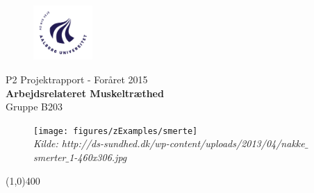 \clearpage
\thispagestyle{empty}

\begin{figure}[H]
	\raggedleft
		\includegraphics[width=0.2\textwidth]{figures/aaulogo-da.png}
\end{figure}
\vspace*{\fill} 
\begin{center}	
\begin{Huge}
P2 Projektrapport - Foråret 2015\\
\vspace{5 mm}
\textbf{Arbejdsrelateret Muskeltræthed}\\
\vspace{3 mm}
Gruppe B203
\end{Huge}
\end{center}
\vspace*{\fill}

\begin{figure}[H]
		\centering
		\texttt{[image: figures/zExamples/smerte]}
		\\ \small{\textit{Kilde: http://ds-sundhed.dk/wp-content/uploads/2013/04/nakke$\_$smerter$\_$1-460x306.jpg}}
		\flushleft
\end{figure}


\begin{center}
\line(1,0){400}
\end{center}